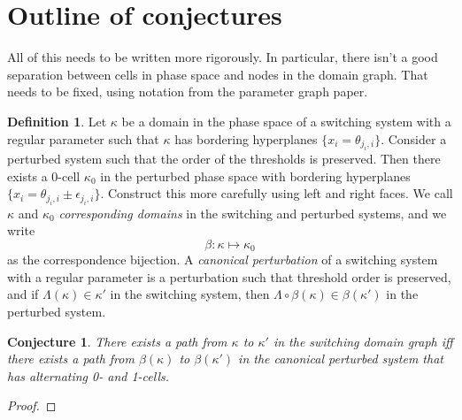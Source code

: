 \documentclass[12pt]{article}
\newtheorem{con}{Conjecture}[section]
\theoremstyle{definition}
\newtheorem{defn}{Definition}[section]
\theoremstyle{remark}
\begin{document}
\section*{Outline of conjectures}

{\color{red} All of this needs to be written more rigorously. In particular, there isn't a good separation between cells in phase space and nodes in the domain graph. That needs to be fixed, using notation from the parameter graph paper.}

\vspace{12pt}


\begin{defn}
	Let $\kappa$ be a domain in the phase space of a switching system with a regular parameter such that $\kappa$ has bordering hyperplanes $\{x_i = \theta_{j_i,i}\}$.	Consider a perturbed system such that the order of the thresholds is preserved. Then there exists a 0-cell $\kappa_0$ in the perturbed phase space with bordering hyperplanes $\{x_i = \theta_{j_i,i} \pm \epsilon_{j_i,i}\}$. {\color{red} Construct this more carefully using left and right faces.} We call $\kappa$ and $\kappa_0$ \textit{corresponding domains} in the switching and perturbed systems, and we write 
	\[
	\beta : \kappa \mapsto \kappa_0
	\] 
	as the correspondence bijection.
	A \textit{canonical perturbation} of a switching system with a regular parameter is a perturbation such that threshold order is preserved, and if $\Lambda(\kappa) \in \kappa'$ in the switching system, then $\Lambda \circ \beta(\kappa) \in \beta(\kappa')$ in the perturbed system.
\end{defn}

\vspace{12pt}

\begin{con}\label{con:equivpath}
	There exists a path from $\kappa$ to $\kappa'$ in the switching domain graph iff there exists a path from $\beta(\kappa)$ to $\beta(\kappa')$ in the canonical perturbed system that has alternating 0- and 1-cells.
\end{con}
\begin{proof}
\end{proof}

\vspace{12pt}
\end{document}
